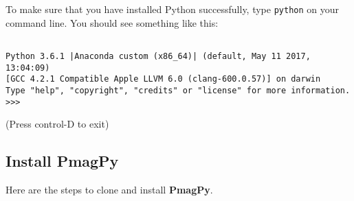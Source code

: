\documentclass[11pt]{article}
\begin{document}
To make sure that you have installed Python successfully, type \texttt{python} on your command line.  You should see something like this: \begin{verbatim}

Python 3.6.1 |Anaconda custom (x86_64)| (default, May 11 2017, 13:04:09)
[GCC 4.2.1 Compatible Apple LLVM 6.0 (clang-600.0.57)] on darwin
Type "help", "copyright", "credits" or "license" for more information.
>>>\end{verbatim}
(Press control-D to exit)



\subsection{Install PmagPy}

Here are the steps to clone and install {\bf PmagPy}.
\end{document}
